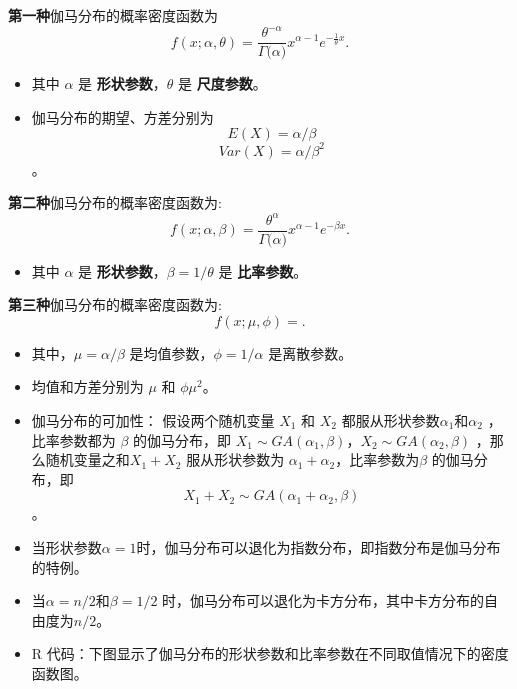 \documentclass[
]{book}
\providecommand{\tightlist}{%
  \setlength{\itemsep}{0pt}\setlength{\parskip}{0pt}}
\begin{document}
\textbf{第一种}伽马分布的概率密度函数为 \[
f(x; \alpha, \theta)=\frac{{{\theta }^{-\alpha }}}{\Gamma \text{(}\alpha )}{{x}^{\alpha -1}}{{e}^{-\frac{1}{\theta} x}}.\]

\begin{itemize}
\item
  其中 \(\alpha\) 是 \textbf{形状参数}，\(\theta\) 是 \textbf{尺度参数}。
\item
  伽马分布的期望、方差分别为 \[E(X)=\alpha/\beta\] \[Var(X)=\alpha/\beta^2\]。
\end{itemize}

\textbf{第二种}伽马分布的概率密度函数为:
\[
f(x; \alpha, \beta)=\frac{{{\theta }^{\alpha }}}{\Gamma \text{(}\alpha )}{{x}^{\alpha -1}}{{e}^{-\beta x}}.\]

\begin{itemize}
\tightlist
\item
  其中 \(\alpha\) 是 \textbf{形状参数}，\(\beta=1/\theta\) 是 \textbf{比率参数}。
\end{itemize}

\textbf{第三种}伽马分布的概率密度函数为:
\[
f(x; \mu, \phi)=.\]

\begin{itemize}
\item
  其中，\(\mu=\alpha/\beta\) 是均值参数，\(\phi=1/\alpha\) 是离散参数。
\item
  均值和方差分别为 \(\mu\) 和 \(\phi\mu^2\)。
\item
  伽马分布的可加性：
  假设两个随机变量 \(X_1\) 和 \(X_2\) 都服从形状参数\(\alpha_1\)和\(\alpha_2\) ，比率参数都为 \(\beta\) 的伽马分布，即 \(X_1\sim GA(\alpha_1,\beta)\)，\(X_2\sim GA(\alpha_2,\beta)\) ，那么随机变量之和\(X_1+X_2\) 服从形状参数为 \(\alpha_1+\alpha_2\)，比率参数为\(\beta\) 的伽马分布，即\[X_1+X_2\sim GA(\alpha_1+\alpha_2,\beta)\] 。
\item
  当形状参数\(\alpha=1\)时，伽马分布可以退化为指数分布，即指数分布是伽马分布的特例。
\item
  当\(\alpha=n/2\)和\(\beta=1/2\) 时，伽马分布可以退化为卡方分布，其中卡方分布的自由度为\(n/2\)。
\item
  R 代码：下图显示了伽马分布的形状参数和比率参数在不同取值情况下的密度函数图。
\end{itemize}
\end{document}
